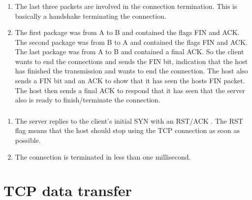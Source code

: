 \documentclass[a4paper]{article}
\begin{document}
\subsubsection{}
\begin{enumerate}[label=\alph*)]
\item The last three packets are involved in the connection termination. This is basically a handshake terminating the connection.\newline
\item The first package was from A to B and contained the flags FIN and ACK.\newline
    The second package was from B to A and contained the flags FIN and ACK.\newline
    The last package was from A to B and contained a final ACK.\newline
\newline
So the client wants to end the connections and sends the FIN bit, indication that the host has finished the transmission and wants to end the connection. The host also sends a FIN bit and an ACK to show that it has seen the hosts FIN packet. The host then sends a final ACK to respond that it has seen that the server also is ready to finish/terminate the connection.
\end{enumerate}
\setcounter{subsection}{2}
\setcounter{subsubsection}{4}
\subsubsection{}
\begin{enumerate}[label=\alph*)]
\item The server replies to the client’s initial SYN with an RST/ACK . The RST flag means that the host should stop using the TCP connection as soon as possible. 
\item The connection is terminated in less than one millisecond.
\end{enumerate}
\section{TCP data transfer}
\setcounter{subsection}{1}
\setcounter{subsubsection}{3}
\end{document}
